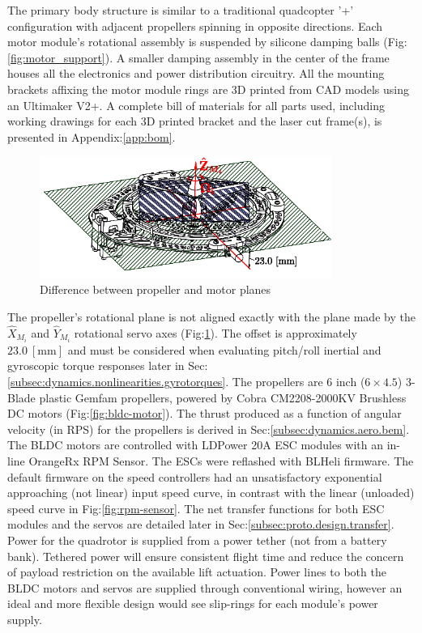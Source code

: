 \par
The primary body structure is similar to a traditional quadcopter '+' configuration with adjacent propellers spinning in opposite directions. Each motor module's rotational assembly is suspended by silicone damping balls (Fig:\ref{fig:motor_support}). A smaller damping assembly in the center of the frame houses all the electronics and power distribution circuitry. All the mounting brackets affixing the motor module rings are 3D printed from CAD models using an Ultimaker V2+\cite{ultimaker}. A complete bill of materials for all parts used, including working drawings for each 3D printed bracket and the laser cut frame(s), is presented in Appendix:\ref{app:bom}.
\par
\begin{figure}[hbtp]
\centering
\includegraphics[width=0.85\textwidth]{figs/motor-prop}
\vspace{-10pt}
\caption{Difference between propeller and motor planes}
\label{fig:motor_prop}
\vspace{-15pt}
\end{figure}
The propeller's rotational plane is not aligned exactly with the plane made by the $\hat{X}_{M_i}$ and $\hat{Y}_{M_i}$ rotational servo axes (Fig:\ref{fig:motor_prop}). The offset is approximately $23.0~[\text{mm}]$ and must be considered when evaluating pitch/roll inertial and gyroscopic torque responses later in Sec:\ref{subsec:dynamics.nonlinearities.gyrotorques}. The propellers are 6 inch ($6 \times 4.5$) 3-Blade plastic Gemfam propellers, powered by Cobra CM2208-2000KV Brushless DC motors (Fig:\ref{fig:bldc-motor}). The thrust produced as a function of angular velocity (in RPS) for the propellers is derived in Sec:\ref{subsec:dynamics.aero.bem}. 
\newpage
The BLDC motors are controlled with LDPower 20A ESC modules with an in-line OrangeRx RPM Sensor. The ESCs were reflashed with BLHeli\cite{BLHeli} firmware. The default firmware on the speed controllers had an unsatisfactory exponential approaching (not linear) input speed curve, in contrast with the linear (unloaded) speed curve in Fig:\ref{fig:rpm-sensor}. The net transfer functions for both ESC modules and the servos are detailed later in Sec:\ref{subsec:proto.design.transfer}. Power for the quadrotor is supplied from a power tether (not from a battery bank). Tethered power will ensure consistent flight time and reduce the concern of payload restriction on the available lift actuation. Power lines to both the BLDC motors and servos are supplied through conventional wiring, however an ideal and more flexible design would see slip-rings for each module's power supply. 
